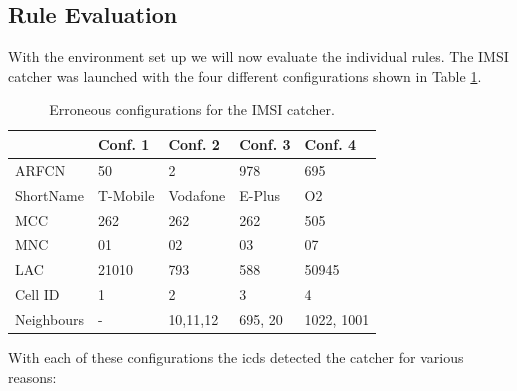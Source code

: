 \subsection{Rule Evaluation}
With the environment set up we will now evaluate the individual rules.
The IMSI catcher was launched with the four different configurations shown in Table \ref{tab:err_configs}.
\begin{table}
\centering
\begin{tabular}{lllll}
\toprule
			&Conf. 1		&Conf. 2		&Conf. 3		&Conf. 4\\
\midrule
ARFCN		&50				&2				&978			&695	\\
ShortName	&T-Mobile		&Vodafone		&E-Plus			&O2		\\
MCC			&262			&262			&262			&505	\\
MNC			&01				&02				&03				&07	\\
LAC			&21010			&793			&588			&50945	\\
Cell ID		&1				&2				&3				&4		\\
Neighbours	&-				&10,11,12		&695, 20		&1022, 1001 \\
\bottomrule
\end{tabular}
\caption{Erroneous configurations for the IMSI catcher.}
\label{tab:err_configs}
\end{table}
With each of these configurations the \gls{icds} detected the catcher for various reasons:
